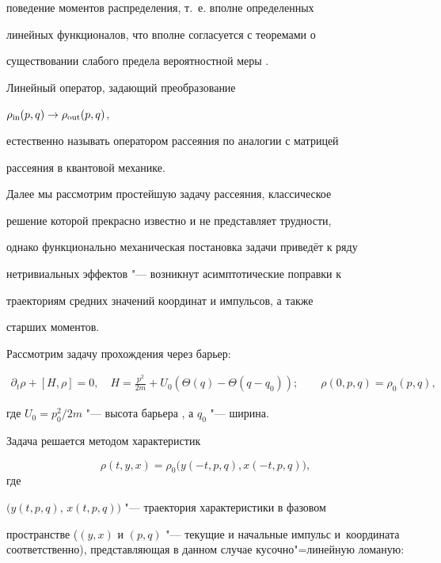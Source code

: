поведение моментов распределения, т.~е. вполне определенных

линейных функционалов, что вполне согласуется с теоремами о

существовании слабого предела вероятностной меры \cite{Kozlov}.

Линейный оператор, задающий преобразование

$\rho_{\rm in}(p,q)\to\rho_{\rm out}(p,q)$,

 естественно называть оператором рассеяния по аналогии с матрицей

 рассеяния в квантовой механике.

  Далее мы рассмотрим  простейшую задачу рассеяния, классическое

  решение которой прекрасно известно и не представляет трудности,

  однако функционально механическая постановка задачи приведёт к ряду

  нетривиальных эффектов  "--- возникнут асимптотические поправки к

  траекториям средних значений координат и импульсов, а также

  старших моментов.

  

  \smallskip

  


Рассмотрим задачу прохождения через барьер:

\begin{gather}

\partial_t \rho + [H,\rho]=0,

\quad 

H=\frac{p^2}{2m}+U_0 ( \Theta(q)-\Theta(q -q_0));

\qquad 

\rho(0,p,q)=\rho_0(p,q),

\end{gather}

где $U_0 = p_0^2/2m$ "--- высота барьера , а $q_0$ "--- ширина.





Задача решается методом характеристик

$$\rho(t,y,x)=\rho_0\bigl(y(-t,p,q),x(-t,p,q)\bigr),$$ где

$(y(t,p,q)$, $x(t,p,q))$ "---  траектория характеристики в фазовом

пространстве ($(y,x)$ и $(p,q)$ "--- текущие и начальные импульс и~координата соответственно), представляющая в данном случае кусочно"=линейную ломаную:

